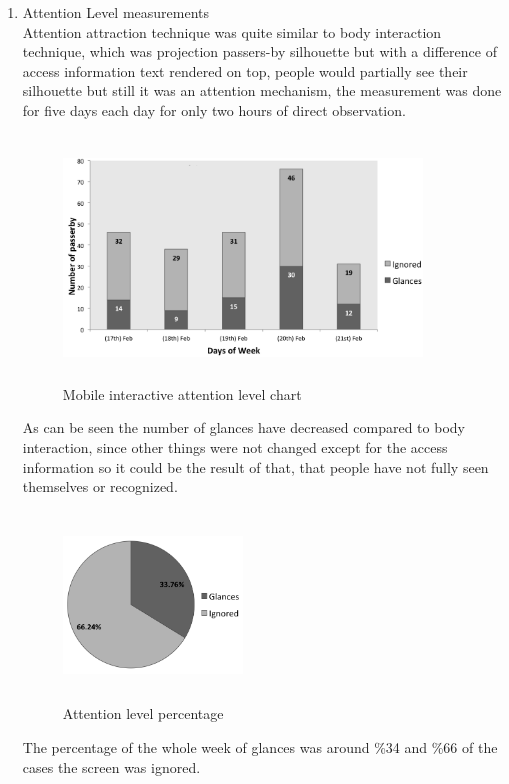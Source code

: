 \begin{enumerate}

\item Attention Level measurements \\
Attention attraction technique was quite similar to body interaction technique, which was projection passers-by silhouette but with a difference of access information text rendered on top, people would partially see their silhouette but still it was an attention mechanism, the measurement was done for five days each day for only two hours of direct observation. 


\begin{figure}[H]
    \centering
    \includegraphics[width=0.9\textwidth,height=6.5cm]{Figures/8/mobile_inter_findings/mobile_Inter_chart}%
    \caption{Mobile interactive attention level chart}%
    \label{fig:mobileattentionlevelchart}%
\end{figure}

As can be seen the number of glances have decreased compared to body interaction, since other things were not changed except for the access information so it could be the result of that, that people have not fully seen themselves or recognized. 

\begin{figure}[H]
    \centering
    \includegraphics[width=0.45\textwidth,height=5cm]{Figures/8/mobile_inter_findings/mobile_inter_percentage}
    \caption{Attention level percentage}%
    \label{fig:bodyattentionlevelpercentage}%
\end{figure}
The percentage of the whole week of glances was around \%34 and \%66 of the cases the screen was ignored.


\end{enumerate}
